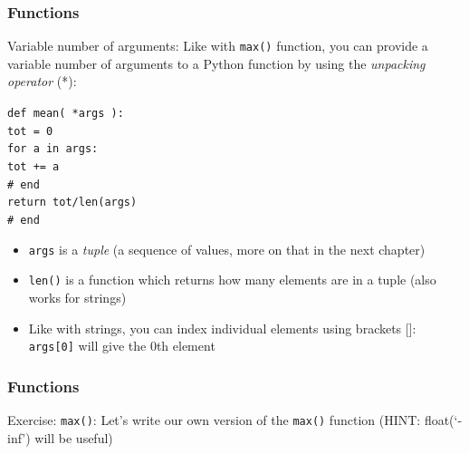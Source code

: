 \documentclass{beamer}
\newcommand{\code}[1]{\texttt{#1}}
\newcommand{\tab}{\hspace*{22pt}}
\begin{document}
\begin{frame}%
	\frametitle{Functions}
	
	\begin{block}{Variable number of arguments:}
		Like with \code{max()} function, you can provide a variable number of arguments to a Python function by using the \emph{unpacking operator} (*):
		
		\vspace{10pt}
			\code{def mean( *args ):\\
					\tab tot = 0 \\
					\tab for a in args: \\
					\tab \tab tot += a \\
					\tab \# end \\
					\tab return tot/len(args) \\
					\# end
			}
			
			
		\endminipage\hfill
			\begin{itemize}
			\item \code{args} is a \emph{tuple} (a sequence of values, more on that in the next chapter)
			\item \code{len()} is a function which returns how many elements are in a tuple (also works for strings)
			\item Like with strings, you can index individual elements using brackets []: \code{args[0]} will give the 0th element
			\end{itemize}
		\endminipage\hfill
	\end{block}
	
\end{frame}

\begin{frame}%
	\frametitle{Functions}
	
	\begin{exampleblock}{Exercise: \code{max()}:}
		Let's write our own version of the \code{max()} function (HINT: float(`-inf') will be useful)
	\end{exampleblock}
	
\end{frame}
\end{document}
